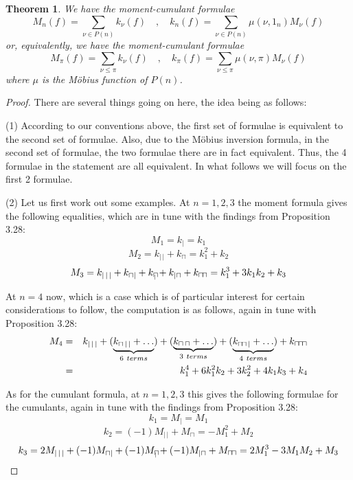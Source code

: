 \documentclass[12pt]{amsbook}
\newtheorem{theorem}{Theorem}[chapter]
\begin{document}

\begin{theorem}
We have the moment-cumulant formulae
$$M_n(f)=\sum_{\nu\in P(n)}k_\nu(f)\quad,\quad 
k_n(f)=\sum_{\nu\in P(n)}\mu(\nu,1_n)M_\nu(f)$$
or, equivalently, we have the moment-cumulant formulae
$$M_\pi(f)=\sum_{\nu\leq\pi}k_\nu(f)\quad,\quad 
k_\pi(f)=\sum_{\nu\leq\pi}\mu(\nu,\pi)M_\nu(f)$$
where $\mu$ is the M\"obius function of $P(n)$.
\end{theorem}

\begin{proof}
There are several things going on here, the idea being as follows:

\medskip

(1) According to our conventions above, the first set of formulae is equivalent to the second set of formulae. Also, due to the M\"obius inversion formula, in the second set of formulae, the two formulae there are in fact equivalent. Thus, the 4 formulae in the statement are all equivalent. In what follows we will focus on the first 2 formulae.

\medskip

(2) Let us first work out some examples. At $n=1,2,3$ the moment formula gives the following equalities, which are in tune with the findings from Proposition 3.28:
$$M_1=k_|=k_1$$
$$M_2=k_{|\,|}+k_\sqcap=k_1^2+k_2$$
$$M_3=k_{|\,|\,|}+k_{\sqcap|}+k_{\sqcap\hskip-2.8mm{\ }_|}+k_{|\sqcap}+k_{\sqcap\hskip-0.5mm\sqcap}=k_1^3+3k_1k_2+k_3$$

At $n=4$ now, which is a case which is of particular interest for certain considerations to follow, the computation is as follows, again in tune with Proposition 3.28:
\begin{eqnarray*}
M_4
&=&k_{|\,|\,|}+(\underbrace{k_{\sqcap\,|\,|}+\ldots}_{6\ terms})+(\underbrace{k_{\sqcap\,\sqcap}+\ldots}_{3\ terms})+(\underbrace{k_{\sqcap\hskip-0.5mm\sqcap\,|}+\ldots}_{4\ terms})+k_{\sqcap\hskip-0.5mm\sqcap\hskip-0.5mm\sqcap}\\
&=&k_1^4+6k_1^2k_2+3k_2^2+4k_1k_3+k_4
\end{eqnarray*}

As for the cumulant formula, at $n=1,2,3$ this gives the following formulae for the cumulants, again in tune with the findings from Proposition 3.28:
$$k_1=M_|=M_1$$
$$k_2=(-1)M_{|\,|}+M_\sqcap=-M_1^2+M_2$$
$$k_3=2M_{|\,|\,|}+(-1)M_{\sqcap|}+(-1)M_{\sqcap\hskip-2.8mm{\ }_|}+(-1)M_{|\sqcap}+M_{\sqcap\hskip-0.5mm\sqcap}=2M_1^3-3M_1M_2+M_3$$


\end{proof}
\end{document}
